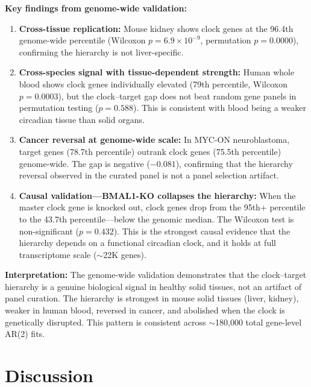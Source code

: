\documentclass[11pt,a4paper]{article}
\begin{document}
\textbf{Key findings from genome-wide validation:}

\begin{enumerate}
    \item \textbf{Cross-tissue replication:} Mouse kidney shows clock genes at the 96.4th genome-wide percentile (Wilcoxon $p = 6.9\times10^{-9}$, permutation $p = 0.0000$), confirming the hierarchy is not liver-specific.
    
    \item \textbf{Cross-species signal with tissue-dependent strength:} Human whole blood shows clock genes individually elevated (79th percentile, Wilcoxon $p = 0.0003$), but the clock--target gap does not beat random gene panels in permutation testing ($p = 0.588$). This is consistent with blood being a weaker circadian tissue than solid organs.
    
    \item \textbf{Cancer reversal at genome-wide scale:} In MYC-ON neuroblastoma, target genes (78.7th percentile) outrank clock genes (75.5th percentile) genome-wide. The gap is negative ($-0.081$), confirming that the hierarchy reversal observed in the curated panel is not a panel selection artifact.
    
    \item \textbf{Causal validation---BMAL1-KO collapses the hierarchy:} When the master clock gene is knocked out, clock genes drop from the 95th+ percentile to the 43.7th percentile---below the genomic median. The Wilcoxon test is non-significant ($p = 0.432$). This is the strongest causal evidence that the hierarchy depends on a functional circadian clock, and it holds at full transcriptome scale ($\sim$22K genes).
\end{enumerate}

\textbf{Interpretation:} The genome-wide validation demonstrates that the clock--target hierarchy is a genuine biological signal in healthy solid tissues, not an artifact of panel curation. The hierarchy is strongest in mouse solid tissues (liver, kidney), weaker in human blood, reversed in cancer, and abolished when the clock is genetically disrupted. This pattern is consistent across $\sim$180,000 total gene-level AR(2) fits.

\section{Discussion}
\end{document}
